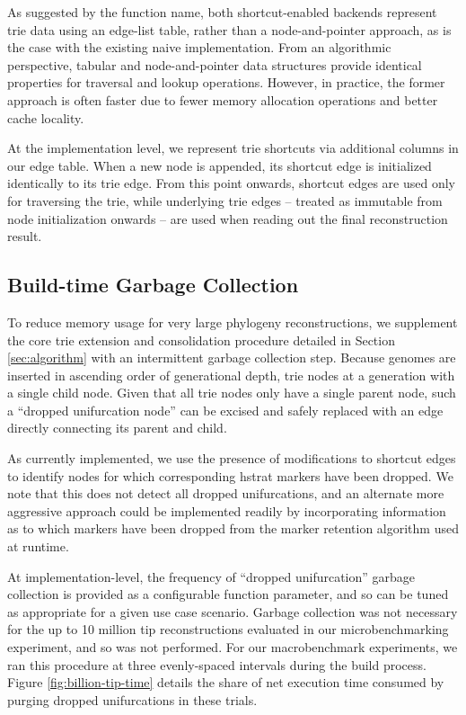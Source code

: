As suggested by the function name, both shortcut-enabled backends represent trie data using an edge-list table, rather than a node-and-pointer approach, as is the case with the existing naive implementation.
From an algorithmic perspective, tabular and node-and-pointer data structures provide identical properties for traversal and lookup operations.
However, in practice, the former approach is often faster due to fewer memory allocation operations and better cache locality.

At the implementation level, we represent trie shortcuts via additional columns in our edge table.
When a new node is appended, its shortcut edge is initialized identically to its trie edge.
From this point onwards, shortcut edges are used only for traversing the trie, while underlying trie edges -- treated as immutable from node initialization onwards -- are used when reading out the final reconstruction result.

\subsection{Build-time Garbage Collection}

To reduce memory usage for very large phylogeny reconstructions, we supplement the core trie extension and consolidation procedure detailed in Section \ref{sec:algorithm} with an intermittent garbage collection step.
Because genomes are inserted in ascending order of generational depth, trie nodes at a generation with a single child node.
Given that all trie nodes only have a single parent node, such a ``dropped unifurcation node'' can be excised and safely replaced with an edge directly connecting its parent and child.

As currently implemented, we use the presence of modifications to shortcut edges to identify nodes for which corresponding hstrat markers have been dropped.
We note that this does not detect all dropped unifurcations, and an alternate more aggressive approach could be implemented readily by incorporating information as to which markers have been dropped from the marker retention algorithm used at runtime.

At implementation-level, the frequency of ``dropped unifurcation'' garbage collection is provided as a configurable function parameter, and so can be tuned as appropriate for a given use case scenario.
Garbage collection was not necessary for the up to 10 million tip reconstructions evaluated in our microbenchmarking experiment, and so was not performed.
For our macrobenchmark experiments, we ran this procedure at three evenly-spaced intervals during the build process.
Figure \ref{fig:billion-tip-time} details the share of net execution time consumed by purging dropped unifurcations in these trials.

